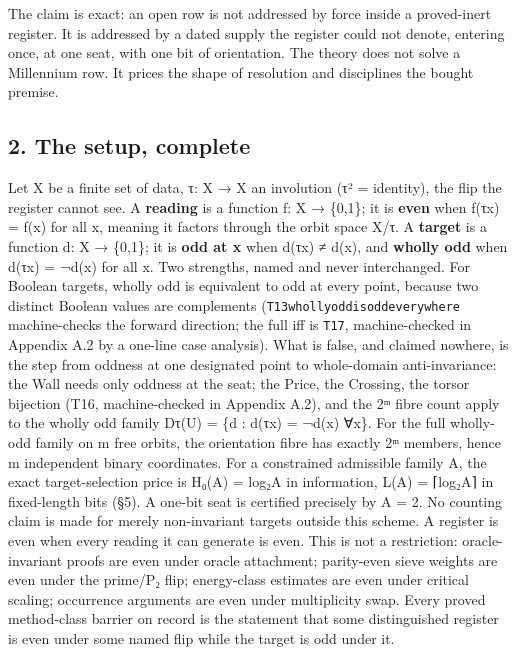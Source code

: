 \documentclass[10pt]{article}
\renewcommand{\_}{\origunderscore\allowbreak}
\begin{document}
The claim is exact: an open row is not addressed by force inside a
proved-inert register. It is addressed by a dated supply the register
could not denote, entering once, at one seat, with one bit of
orientation. The theory does not solve a Millennium row. It prices the
shape of resolution and disciplines the bought premise.

\hypertarget{the-setup-complete}{%
\subsection{2. The setup, complete}\label{the-setup-complete}}

Let X be a finite set of data, τ: X → X an involution (τ² = identity),
the flip the register cannot see. A \textbf{reading} is a function f: X
→ \{0,1\}; it is \textbf{even} when f(τx) = f(x) for all x, meaning it
factors through the orbit space X/τ. A \textbf{target} is a function d:
X → \{0,1\}; it is \textbf{odd at x} when d(τx) ≠ d(x), and
\textbf{wholly odd} when d(τx) = ¬d(x) for all x. Two strengths, named
and never interchanged. For Boolean targets, wholly odd is equivalent to
odd at every point, because two distinct Boolean values are complements
(\texttt{T13\_wholly\_odd\_is\_odd\_everywhere} machine-checks the
forward direction; the full iff is \texttt{T17}, machine-checked in
Appendix A.2 by a one-line case analysis). What is false, and claimed
nowhere, is the step from oddness at one designated point to
whole-domain anti-invariance: the Wall needs only oddness at the seat;
the Price, the Crossing, the torsor bijection (T16, machine-checked in
Appendix A.2), and the 2ᵐ fibre count apply to the wholly odd family
Dτ(U) = \{d : d(τx) = ¬d(x) ∀x\}. For the full wholly-odd family on m
free orbits, the orientation fibre has exactly 2ᵐ members, hence m
independent binary coordinates. For a constrained admissible family A,
the exact target-selection price is H₀(A) = log₂\textbar A\textbar{} in
information, L(A) = ⌈log₂\textbar A\textbar⌉ in fixed-length bits (§5).
A one-bit seat is certified precisely by \textbar A\textbar{} = 2. No
counting claim is made for merely non-invariant targets outside this
scheme. A register is even when every reading it can generate is even.
This is not a restriction: oracle-invariant proofs are even under oracle
attachment; parity-even sieve weights are even under the prime/P₂ flip;
energy-class estimates are even under critical scaling; occurrence
arguments are even under multiplicity swap. Every proved method-class
barrier on record is the statement that some distinguished register is
even under some named flip while the target is odd under it.
\end{document}
